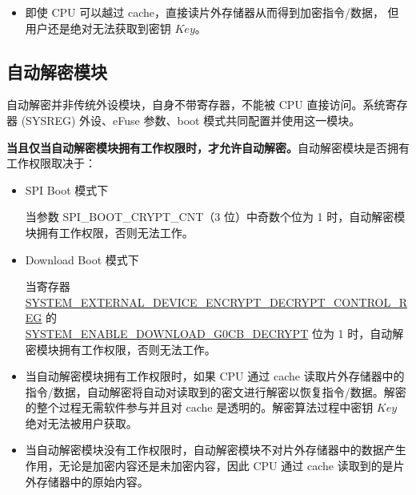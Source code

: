 \documentclass[main\_\_CN.tex]{subfiles}
\begin{document}
\begin{tiplisting}
\vspace{-2em}
\begin{itemize}
\item 即使 CPU 可以越过 cache，直接读片外存储器从而得到加密指令/数据，
但用户还是绝对无法获取到密钥 \begin{math}Key\end{math}。
\end{itemize}
\end{tiplisting}


\subsection{自动解密模块}

自动解密并非传统外设模块，自身不带寄存器，不能被 CPU 直接访问。系统寄存器 (SYSREG) 外设、eFuse 参数、boot 模式共同配置并使用这一模块。

\textbf{当且仅当自动解密模块拥有工作权限时，才允许自动解密。}自动解密模块是否拥有工作权限取决于：

\begin{itemize}
    
    \item SPI Boot 模式下
    
    当参数 SPI\_BOOT\_CRYPT\_CNT（3 位）中奇数个位为 1 时，自动解密模块拥有工作权限，否则无法工作。
    
    \item Download Boot 模式下
    
    当寄存器 \hyperref[regdesc:SYSTEMEXTERNALDEVICEENCRYPTDECRYPTCONTROLREG]{SYSTEM\_EXTERNAL\_DEVICE\_ENCRYPT\_DECRYPT\_CONTROL\_REG} 的 \\ \hyperref[fielddesc:SYSTEMENABLEDOWNLOADG0CBDECRYPT]{SYSTEM\_ENABLE\_DOWNLOAD\_G0CB\_DECRYPT} 位为 1 时，自动解密模块拥有工作权限，否则无法工作。
    
\end{itemize}


\begin{tiplisting}
\vspace{-2em}
\begin{itemize}

\item 当自动解密模块拥有工作权限时，如果 CPU 通过 cache 读取片外存储器中的指令/数据，自动解密将自动对读取到的密文进行解密以恢复指令/数据。解密的整个过程无需软件参与并且对 cache 是透明的。解密算法过程中密钥 \begin{math}Key\end{math} 绝对无法被用户获取。

\item 当自动解密模块没有工作权限时，自动解密模块不对片外存储器中的数据产生作用，无论是加密内容还是未加密内容，因此 CPU 通过 cache 读取到的是片外存储器中的原始内容。

\end{itemize}
\end{tiplisting}
\end{document}
